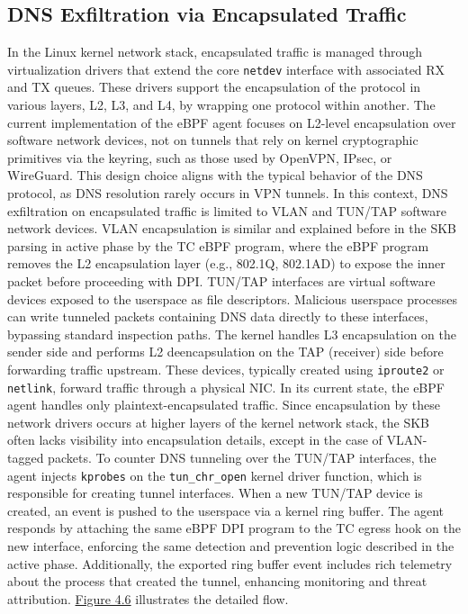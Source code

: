 \documentclass [11pt, proquest] {uwthesis}[2020/02/24]
\begin{document}
\subsection{DNS Exfiltration via Encapsulated Traffic}
\label{sec:encap}
In the Linux kernel network stack, encapsulated traffic is managed through virtualization drivers that extend the core \texttt{netdev} interface with associated RX and TX queues. These drivers support the encapsulation of the protocol in various layers, L2, L3, and L4, by wrapping one protocol within another. 
The current implementation of the eBPF agent focuses on L2-level encapsulation over software network devices, not on tunnels that rely on kernel cryptographic primitives via the keyring, such as those used by OpenVPN, IPsec, or WireGuard. This design choice aligns with the typical behavior of the DNS protocol, as DNS resolution rarely occurs in VPN tunnels. In this context, DNS exfiltration on encapsulated traffic is limited to VLAN and TUN/TAP software network devices. VLAN encapsulation is similar and explained before in the SKB parsing in active phase by the TC eBPF program, where the eBPF program removes the L2 encapsulation layer (e.g., 802.1Q, 802.1AD) to expose the inner packet before proceeding with DPI.
TUN/TAP interfaces are virtual software devices exposed to the userspace as file descriptors. Malicious userspace processes can write tunneled packets containing DNS data directly to these interfaces, bypassing standard inspection paths. The kernel handles L3 encapsulation on the sender side and performs L2 deencapsulation on the TAP (receiver) side before forwarding traffic upstream. These devices, typically created using \texttt{iproute2} or \texttt{netlink}, forward traffic through a physical NIC. In its current state, the eBPF agent handles only plaintext-encapsulated traffic. Since encapsulation by these network drivers occurs at higher layers of the kernel network stack, the SKB often lacks visibility into encapsulation details, except in the case of VLAN-tagged packets. To counter DNS tunneling over the TUN/TAP interfaces, the agent injects \texttt{kprobes} on the \texttt{tun\_chr\_open} kernel driver function, which is responsible for creating tunnel interfaces. When a new TUN/TAP device is created, an event is pushed to the userspace via a kernel ring buffer. The agent responds by attaching the same eBPF DPI program to the TC egress hook on the new interface, enforcing the same detection and prevention logic described in the active phase. 
Additionally, the exported ring buffer event includes rich telemetry about the process that created the tunnel, enhancing monitoring and threat attribution. \hyperref[sec:data_plane_tunnel_netdev]{Figure 4.6} illustrates the detailed flow.
\end{document}
